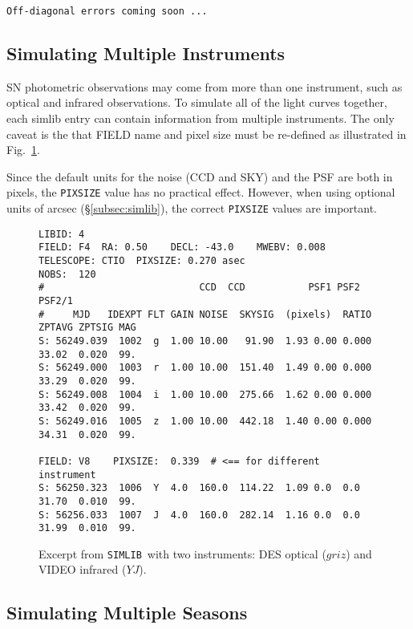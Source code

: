 \documentclass[12pt]{article}
\newcommand{\simlib}{{\tt SIMLIB}}
\begin{document}
{\bigskip
{\tt Off-diagonal errors coming soon ...}


   \clearpage
   \subsection{Simulating Multiple Instruments}
   \label{subsec:multi_telescope}

SN photometric observations may come from more than one instrument,
such as optical and infrared observations. 
To simulate all of the light curves together, 
each simlib entry can contain information from multiple
instruments. The only caveat is the that FIELD name and
pixel size must be re-defined as illustrated in 
Fig.~\ref{fig:simlib_merge}.

Since the default units for the noise (CCD and SKY)
and the PSF are both in pixels, the {\tt PIXSIZE} value
has no practical effect. However, when using optional 
units of arcsec (\S\ref{subsec:simlib}),
the correct {\tt PIXSIZE} values are important.
%
\begin{figure} [hb] 
\begin{center}
\begin{Verbatim}[frame=single]
LIBID: 4 
FIELD: F4  RA: 0.50    DECL: -43.0    MWEBV: 0.008
TELESCOPE: CTIO  PIXSIZE: 0.270 asec
NOBS:  120
#                           CCD  CCD           PSF1 PSF2 PSF2/1                    
#     MJD   IDEXPT FLT GAIN NOISE  SKYSIG  (pixels)  RATIO ZPTAVG ZPTSIG MAG 
S: 56249.039  1002  g  1.00 10.00   91.90  1.93 0.00 0.000  33.02  0.020  99.
S: 56249.000  1003  r  1.00 10.00  151.40  1.49 0.00 0.000  33.29  0.020  99.
S: 56249.008  1004  i  1.00 10.00  275.66  1.62 0.00 0.000  33.42  0.020  99.
S: 56249.016  1005  z  1.00 10.00  442.18  1.40 0.00 0.000  34.31  0.020  99.

FIELD: V8    PIXSIZE:  0.339  # <== for different instrument
S: 56250.323  1006  Y  4.0  160.0  114.22  1.09 0.0  0.0    31.70  0.010  99.
S: 56256.033  1007  J  4.0  160.0  282.14  1.16 0.0  0.0    31.99  0.010  99.
\end{Verbatim}
\end{center}
\caption{
  Excerpt from \simlib\ with two instruments:
  DES optical ($griz$) and VIDEO infrared ($YJ$).
 }
\label{fig:simlib_merge}
\end{figure}


   \subsection{Simulating Multiple Seasons}
   \label{subsec:multi_seasons}

}
\end{document}
